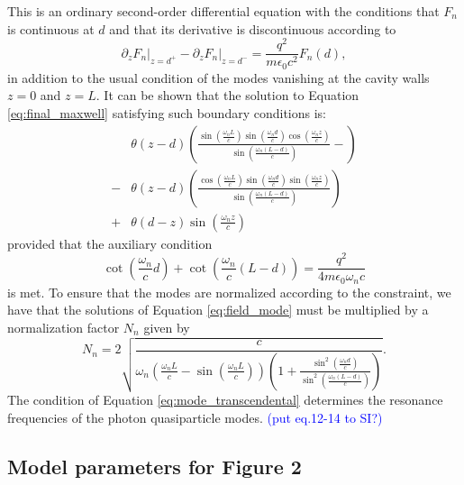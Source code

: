 \documentclass[aps,prb,onecolumn,preprint,
	groupedaddress,superscriptaddress,
	amsfonts,amssymb,amsmath,floatfix,
	citeautoscript]{revtex4-1}
\newcommand{\Jadd}[1]{\textcolor{blue}{#1}}
\begin{document}
This is an ordinary second-order differential equation with the conditions that $F_n$ is continuous at $d$ and that its derivative is discontinuous according to 
\begin{equation}\label{eq:boundary_condition}
\partial_zF_n\Big|_{z=d^+}-\partial_zF_n\Big|_{z=d^-} = \frac{q^2}{m\epsilon_0 c^2}F_n(d),
\end{equation}
in addition to the usual condition of the modes vanishing at the cavity walls $z=0$ and $z=L$. It can be shown that the solution to Equation \ref{eq:final_maxwell} satisfying such boundary conditions is:
\begin{align}\label{eq:field_mode}
&\theta (z-d) \left(\frac{\sin\left(\frac{\omega_nL}{c}\right)\sin\left(\frac{\omega_nd}{c}\right)\cos\left(\frac{\omega_nz}{c}\right)}{\sin\left(\frac{\omega_n(L-d)}{c}\right)}-\right) \nonumber \\ 
-&\theta (z-d) \left(\frac{\cos\left(\frac{\omega_nL}{c}\right)\sin\left(\frac{\omega_nd}{c}\right)\sin\left(\frac{\omega_nz}{c}\right)}{\sin\left(\frac{\omega_n(L-d)}{c}\right)}\right) \nonumber \\ 
+&\theta (d-z) \sin\left(\frac{\omega_n z}{c} \right)
\end{align}
provided that the auxiliary condition
\begin{equation}\label{eq:mode_transcendental}
\cot\left(\frac{\omega_n}{c}d \right)+\cot\left(\frac{\omega_n}{c}(L-d) \right) = \frac{q^2}{4m\epsilon_0\omega_nc}
\end{equation}
is met. To ensure that the modes are normalized according to the constraint, we have that the solutions of Equation \ref{eq:field_mode} must be multiplied by a normalization factor $N_n$ given by
\begin{equation}\label{eq:mode_normalization}
N_n = 2\sqrt{\frac{c}{\omega_n\left(\frac{\omega_nL}{c}-\sin\left(\frac{\omega_nL}{c}\right) \right)\left(1+\frac{\sin^2\left(\frac{\omega_nd}{c}\right)}{\sin^2\left(\frac{\omega_n(L-d)}{c}\right)} \right)}}.
\end{equation}
The condition of Equation \ref{eq:mode_transcendental} determines the resonance frequencies of the photon quasiparticle modes. \Jadd{(put eq.12-14 to SI?)}

\subsection{Model parameters for Figure 2}



\end{document}
